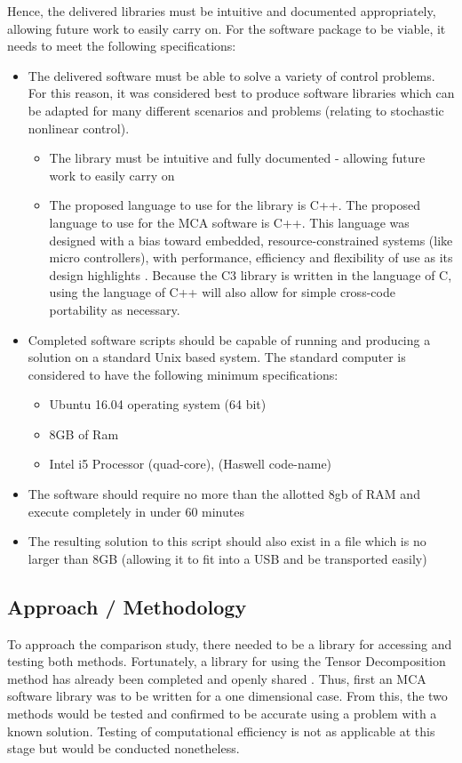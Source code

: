 \documentclass[11pt,draftd]{article}
\begin{document}
Hence, the delivered libraries must be intuitive and documented appropriately, allowing future work to easily carry on. For the software package to be viable, it needs to meet the following specifications:
\begin{itemize}
	\item The delivered software must be able to solve a variety of control problems. For this reason, it was considered best to produce software libraries which can be adapted for many different scenarios and problems (relating to stochastic nonlinear control).
	\begin{itemize}
		\item The library must be intuitive and fully documented - allowing future work to easily carry on
		\item The proposed language to use for the library is C++.  The proposed language to use for the MCA software is C++. This language was designed with a bias toward embedded, resource-constrained systems (like micro controllers), with performance, efficiency and flexibility of use as its design highlights \cite{c++film}. Because the C3 library is written in the language of C, using the language of C++ will also allow for simple cross-code portability as necessary.
	\end{itemize}
	\item Completed software scripts should be capable of running and producing a solution on a standard Unix based system. The standard computer is considered to have the following minimum specifications:
	\begin{itemize}
		\item Ubuntu 16.04 operating system (64 bit)
		\item 8GB of Ram
		\item Intel i5 Processor (quad-core), (Haswell code-name)
	\end{itemize}
	\item The software should require no more than the allotted 8gb of RAM and execute completely in under 60 minutes
	\item The resulting solution to this script should also exist in a file which is no larger than 8GB (allowing it to fit into a USB and be transported easily)
\end{itemize}

\noindent

\subsection{Approach / Methodology}
To approach the comparison study, there needed to be a library for accessing and testing both methods. Fortunately, a library for using the Tensor Decomposition method has already been completed and openly shared \cite{c3c} \cite{c3cs}. Thus, first an MCA software library was to be written for a one dimensional case. From this, the two methods would be tested and confirmed to be accurate using a problem with a known solution. Testing of computational efficiency is not as applicable at this stage but would be conducted nonetheless.\\
\end{document}

